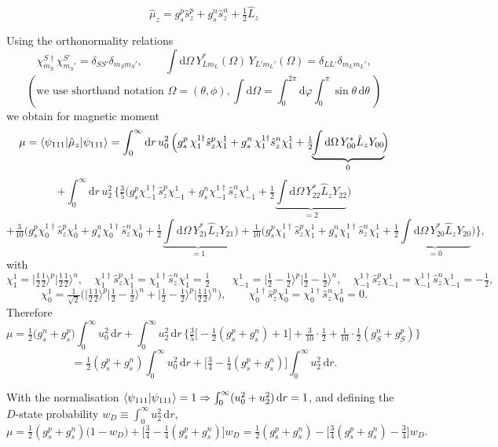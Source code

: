 \documentclass[11pt,a4paper]{article}
\newcommand{\op}[1]{\hat{#1}}
\newcommand{\ud}{\mathrm{d}}
\begin{document}
\[
\op\mu_z=g_s^p\op s_z^p+g_s^n\op s_z^n+\tfrac12\op L_z
\]

Using the orthonormality relations
\[
\chi^{S\dagger}_{m_S}\chi^{S'}_{m_S'}=\delta_{SS'}\delta_{m_Sm_S'},\qquad
\int \ud\Omega\, Y^*_{Lm_L}(\Omega)\,Y_{L'm_L'}(\Omega)=\delta_{LL'}\delta_{m_Lm_L'},
\]
\[
(\text{we use shorthand notation   }
\Omega = (\theta, \phi), 
\int \ud \Omega  = \int_0^{2\pi}\!\ud\varphi\int_0^\pi\!\sin\theta\,\ud\theta\ )
\]
we obtain for magnetic moment
\[
\mu=\braket{\psi_{111}|\op\mu_z|\psi_{111}}=\int_0^\infty \ud r\, u_0^2\,
\Big(g_s^p\,\chi^{1\dagger}_1\op s_z^p\chi^1_1+g_s^n\,\chi^{1\dagger}_1\op s_z^n\chi^1_1
+\tfrac12\!\!\underbrace{\int\ud\Omega\,Y^*_{00}\op L_zY_{00}}_{0}\!\!\Big)
\]
\[
+\int_0^\infty \ud r\, u_2^2\,\Big\{
\tfrac35\Big(g_s^p\chi^{1\dagger}_{-1}\op s_z^p\chi^1_{-1}+g_s^n\chi^{1\dagger}_{-1}\op s_z^n\chi^1_{-1}
+\tfrac12\!\!\underbrace{\int\ud\Omega\,Y^*_{22}\op L_zY_{22}}_{=2}\!\!\Big)
\]
\[
+\tfrac{3}{10}\Big(g_s^p\chi^{1\dagger}_0\op s_z^p\chi^1_0+g_s^n\chi^{1\dagger}_0\op s_z^n\chi^1_0
+\tfrac12\!\!\underbrace{\int\ud\Omega\,Y^*_{21}\op L_zY_{21}}_{=1}\!\!\Big)
+\tfrac{1}{10}\Big(g_s^p\chi^{1\dagger}_1\op s_z^p\chi^1_1+g_s^n\chi^{1\dagger}_1\op s_z^n\chi^1_1
+\tfrac12\!\!\underbrace{\int\ud\Omega\,Y^*_{20}\op L_zY_{20}}_{= 0}\!\!\Big)\Big\},
\]
with
\[
\chi^1_1=\big|\tfrac12\tfrac12\big\rangle^p\big|\tfrac12\tfrac12\big\rangle^n, \quad
\chi^{1\dagger}_1\op s_z^p\chi^1_1=\chi^{1\dagger}_1\op s_z^n\chi^1_1=\tfrac12
\qquad
\chi^1_{-1}=\big|\tfrac12{-}\tfrac12\big\rangle^p\big|\tfrac12{-}\tfrac12\big\rangle^n,\quad
\chi^{1\dagger}_{-1}\op s_z^p\chi^1_{-1}=\chi^{1\dagger}_{-1}\op s_z^n\chi^1_{-1}=-\tfrac12,
\]
\[
\chi^1_0=\tfrac{1}{\sqrt2}\Big(\big|\tfrac12\tfrac12\big\rangle^p\big|\tfrac12{-}\tfrac12\big\rangle^n
+\big|\tfrac12{-}\tfrac12\big\rangle^p\big|\tfrac12\tfrac12\big\rangle^n\Big),\qquad
\chi^{1\dagger}_0\op s_z^p\chi^1_0=\chi^{1\dagger}_0\op s_z^n\chi^1_0=0 .
\]
Therefore
\[
\mu=\tfrac12\big(g_s^n+g_s^p\big)\int_0^\infty u_0^2\,\ud r
+\int_0^\infty u_2^2\,\ud r\,
\Big\{\tfrac35\Big[-\tfrac12(g_s^p+g_s^n)+1\Big]+\tfrac{3}{10}\cdot\tfrac12+\tfrac{1}{10}\cdot\tfrac12(g_S^n+g_S^p)\Big\}
\]
\[
=\tfrac12(g_s^p+g_s^n)\int_0^\infty u_0^2\,\ud r
+\Big[\tfrac34-\tfrac14(g_s^p+g_s^n)\Big]\int_0^\infty u_2^2\,\ud r .
\]

With the normalisation $\braket{\psi_{111}|\psi_{111}}=1\Rightarrow
\int_0^\infty(u_0^2+u_2^2)\,\ud r=1$, and defining the $D$-state probability
$w_D\equiv\int_0^\infty u_2^2\,\ud r$,
\[
\mu=\tfrac12(g_s^p+g_s^n)\big(1-w_D\big)+\Big[\tfrac34-\tfrac14(g_s^p+g_s^n)\Big]w_D
=\tfrac12(g_s^p+g_s^n)-\Big[\tfrac34(g_s^p+g_s^n)-\tfrac34\Big]w_D .
\]
\end{document}
